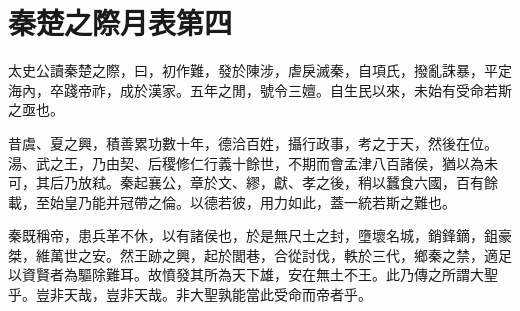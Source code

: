\chapter{秦楚之際月表第四}
			
太史公讀秦楚之際，曰，初作難，發於陳涉，虐戾滅秦，自項氏，撥亂誅暴，平定海內，卒踐帝祚，成於漢家。五年之閒，號令三嬗。自生民以來，未始有受命若斯之亟也。

昔虞、夏之興，積善累功數十年，德洽百姓，攝行政事，考之于天，然後在位。湯、武之王，乃由契、后稷修仁行義十餘世，不期而會孟津八百諸侯，猶以為未可，其后乃放弒。秦起襄公，章於文、繆，獻、孝之後，稍以蠶食六國，百有餘載，至始皇乃能并冠帶之倫。以德若彼，用力如此，蓋一統若斯之難也。

秦既稱帝，患兵革不休，以有諸侯也，於是無尺土之封，墮壞名城，銷鋒鏑，鉏豪桀，維萬世之安。然王跡之興，起於閭巷，合從討伐，軼於三代，鄉秦之禁，適足以資賢者為驅除難耳。故憤發其所為天下雄，安在無土不王。此乃傳之所謂大聖乎。豈非天哉，豈非天哉。非大聖孰能當此受命而帝者乎。

